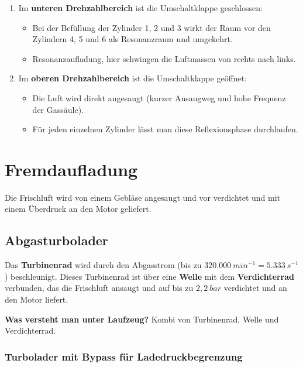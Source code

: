 \begin{enumerate}
\item
  Im \textbf{unteren Drehzahlbereich} ist die Umschaltklappe
  geschlossen:

  \begin{itemize}
  \item
    Bei der Befüllung der Zylinder 1, 2 und 3 wirkt der Raum vor den
    Zylindern 4, 5 und 6 als Resonanzraum und umgekehrt.
  \item
    Resonanzaufladung, hier schwingen die Luftmassen von rechts nach
    links.
  \end{itemize}
\item
  Im \textbf{oberen Drehzahlbereich} ist die Umschaltklappe geöffnet:

  \begin{itemize}
  \item
    Die Luft wird direkt angesaugt (kurzer Ansaugweg und hohe Frequenz
    der Gassäule).\\
  \item
    Für jeden einzelnen Zylinder lässt man diese Reflexionsphase
    durchlaufen.
  \end{itemize}
\end{enumerate}

\section{Fremdaufladung}\label{fremdaufladung}

Die Frischluft wird von einem Gebläse angesaugt und vor verdichtet und
mit einem Überdruck an den Motor geliefert.

\subsection{Abgasturbolader}\label{abgasturbolader}

Das \textbf{Turbinenrad} wird durch den Abgasstrom (bis zu
$320.000~min^{-1} = 5.333~s^{-1}$) beschleunigt. Dieses Turbinenrad
ist über eine \textbf{Welle} mit dem \textbf{Verdichterrad} verbunden,
das die Frischluft ansaugt und auf bis zu $2,2~bar$ verdichtet und an
den Motor liefert.

\textbf{Was versteht man unter Laufzeug?} Kombi von Turbinenrad, Welle
und Verdichterrad.

\subsubsection{Turbolader mit Bypass für
Ladedruckbegrenzung}\label{turbolader-mit-bypass-fuer-ladedruckbegrenzung}

